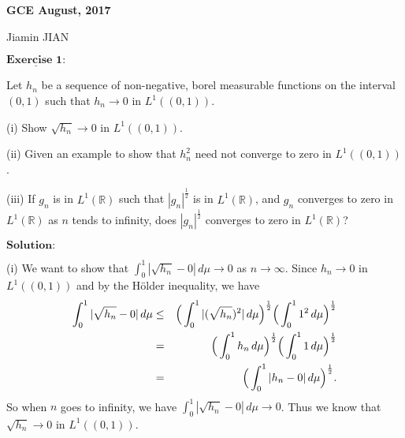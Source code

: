 \documentclass[12pt,a4paper]{ctexart}
\begin{document}
\begin{center}
\textbf{ GCE August, 2017}
\vspace{8pt}

Jiamin JIAN
\end{center}

\vspace{12pt}

$\underline{\textbf{Exercise 1:}}$

Let $h_{n}$ be a sequence of non-negative, borel measurable functions on the interval $(0, 1)$ such that $h_{n} \rightarrow 0$ in $L^{1}((0, 1))$.

(i) Show $\sqrt{h_{n}} \rightarrow 0$ in $L^{1}((0, 1))$.

(ii) Given an example to show that $h_{n}^{2}$ need not converge to zero in $L^{1}((0, 1))$.

(iii) If $g_{n}$ is in $L^{1}(\mathbb{R})$ such that $|g_{n}|^{\frac{1}{2}}$ is in $L^{1}(\mathbb{R})$, and $g_{n}$ converges to zero in $L^{1}(\mathbb{R})$ as $n$ tends to infinity, does $|g_{n}|^{\frac{1}{2}}$ converges to zero in $L^{1}(\mathbb{R})$?

\vspace{8pt}

$\textbf{Solution:}$

(i) We want to show that $\int_{0}^{1} |\sqrt{h_{n}} - 0| \, d \mu \rightarrow 0$ as $n \rightarrow \infty$. Since $h_{n} \rightarrow 0$ in $L^{1}((0, 1))$ and by the H\"older inequality, we have
\begin{eqnarray*}
\int_{0}^{1} |\sqrt{h_{n}} - 0| \, d \mu & \leq & \Big{(} \int_{0}^{1} |(\sqrt{h_{n}})^{2}| \, d \mu \Big{)}^{\frac{1}{2}} \Big{(} \int_{0}^{1} 1^{2} \, d \mu \Big{)}^{\frac{1}{2}} \\
& = & \Big{(} \int_{0}^{1} h_{n} \, d \mu \Big{)}^{\frac{1}{2}} \Big{(} \int_{0}^{1} 1 \, d \mu \Big{)}^{\frac{1}{2}} \\
& = & \Big{(} \int_{0}^{1} |h_{n}-0| \, d \mu \Big{)}^{\frac{1}{2}}.
\end{eqnarray*}
So when $n$ goes to infinity, we have $\int_{0}^{1} |\sqrt{h_{n}} - 0| \, d \mu \rightarrow 0$. Thus we know that $\sqrt{h_{n}} \rightarrow 0$ in $L^{1}((0, 1))$.
\end{document}
